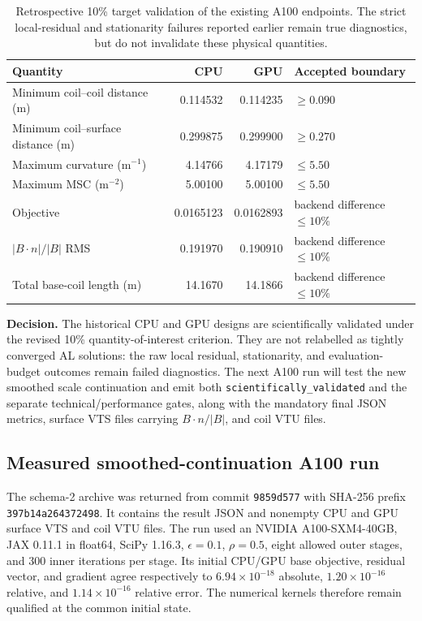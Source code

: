 \documentclass[11pt,a4paper]{article}
\newcommand{\code}[1]{\texttt{#1}}
\begin{document}
\begin{table}[htbp]
\centering
\caption{Retrospective 10\% target validation of the existing A100 endpoints.
The strict local-residual and stationarity failures reported earlier remain
true diagnostics, but do not invalidate these physical quantities.}
\label{tab:qoi-validation-retrospective}
\begin{tabular}{lrrl}
\toprule
Quantity & CPU & GPU & Accepted boundary \\
\midrule
Minimum coil--coil distance (m) & 0.114532 & 0.114235 & $\geq0.090$ \\
Minimum coil--surface distance (m) & 0.299875 & 0.299900 & $\geq0.270$ \\
Maximum curvature (m$^{-1}$) & 4.14766 & 4.17179 & $\leq5.50$ \\
Maximum MSC (m$^{-2}$) & 5.00100 & 5.00100 & $\leq5.50$ \\
Objective & 0.0165123 & 0.0162893 & backend difference $\leq10\%$ \\
$|B\cdot n|/|B|$ RMS & 0.191970 & 0.190910 & backend difference $\leq10\%$ \\
Total base-coil length (m) & 14.1670 & 14.1866 & backend difference $\leq10\%$ \\
\bottomrule
\end{tabular}
\end{table}

\textbf{Decision.}  The historical CPU and GPU designs are scientifically
validated under the revised 10\% quantity-of-interest criterion.  They are not
relabelled as tightly converged AL solutions: the raw local residual,
stationarity, and evaluation-budget outcomes remain failed diagnostics.  The
next A100 run will test the new smoothed scale continuation and emit both
\code{scientifically\_validated} and the separate technical/performance gates,
along with the mandatory final JSON metrics, surface VTS files carrying
$B\cdot n/|B|$, and coil VTU files.

\subsection{Measured smoothed-continuation A100 run}

The schema-2 archive was returned from commit \code{9859d577} with SHA-256
prefix \code{397b14a264372498}.  It contains the result JSON and nonempty CPU
and GPU surface VTS and coil VTU files.  The run used an NVIDIA A100-SXM4-40GB,
JAX 0.11.1 in float64, SciPy 1.16.3, $\epsilon=0.1$, $\rho=0.5$, eight allowed
outer stages, and 300 inner iterations per stage.  Its initial CPU/GPU base
objective, residual vector, and gradient agree respectively to
$6.94\times10^{-18}$ absolute, $1.20\times10^{-16}$ relative, and
$1.14\times10^{-16}$ relative error.  The numerical kernels therefore remain
qualified at the common initial state.
\end{document}
